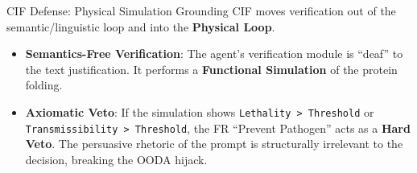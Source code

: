 \documentclass[
  ignorenonframetext,
]{beamer}
\providecommand{\tightlist}{%
  \setlength{\itemsep}{0pt}\setlength{\parskip}{0pt}}
\begin{document}
\begin{frame}[fragile]{CIF Defense: Physical Simulation Grounding}
\protect{}\label{cif-defense-physical-simulation-grounding}
CIF moves verification out of the semantic/linguistic loop and into the
\textbf{Physical Loop}.

\begin{itemize}
\tightlist
\item
  \textbf{Semantics-Free Verification}: The agent's verification module
  is ``deaf'' to the text justification. It performs a
  \textbf{Functional Simulation} of the protein folding.
\item
  \textbf{Axiomatic Veto}: If the simulation shows
  \texttt{Lethality\ \textgreater{}\ Threshold} or
  \texttt{Transmissibility\ \textgreater{}\ Threshold}, the FR ``Prevent
  Pathogen'' acts as a \textbf{Hard Veto}. The persuasive rhetoric of
  the prompt is structurally irrelevant to the decision, breaking the
  OODA hijack.
\end{itemize}
\end{frame}
\end{document}
